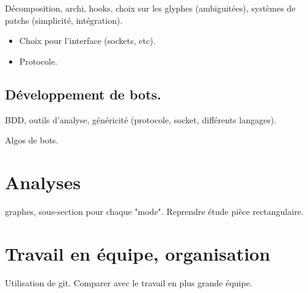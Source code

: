 \documentclass[a4paper]{report}
\begin{document}
Décomposition, archi, hooks, choix sur les glyphes (ambiguitées), systèmes de
patchs (simplicité, intégration).

\begin{itemize}
\item Choix pour l'interface (sockets, etc).
\item Protocole.
\end{itemize}

\subsection{Développement de bots.}

BDD, outils d'analyse, généricité (protocole, socket, différents langages).

Algos de bots.


\section{Analyses}

graphes, sous-section pour chaque "mode". Reprendre étude pièce rectangulaire.


\section{Travail en équipe, organisation}

Utilisation de git.
Comparer avec le travail en plus grande équipe.
\end{document}
